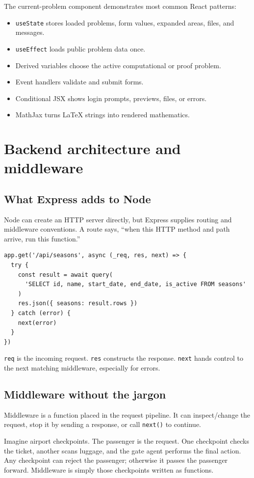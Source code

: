 \documentclass[11pt,oneside]{book}
\newcommand{\code}[1]{\texttt{#1}}
\begin{document}
The current-problem component demonstrates most common React patterns:
\begin{itemize}
  \item \code{useState} stores loaded problems, form values, expanded areas, files, and messages.
  \item \code{useEffect} loads public problem data once.
  \item Derived variables choose the active computational or proof problem.
  \item Event handlers validate and submit forms.
  \item Conditional JSX shows login prompts, previews, files, or errors.
  \item MathJax turns LaTeX strings into rendered mathematics.
\end{itemize}

\chapter{Backend architecture and middleware}

\section{What Express adds to Node}
Node can create an HTTP server directly, but Express supplies routing and middleware conventions. A route says, ``when this HTTP method and path arrive, run this function.''

\begin{lstlisting}
app.get('/api/seasons', async (_req, res, next) => {
  try {
    const result = await query(
      'SELECT id, name, start_date, end_date, is_active FROM seasons'
    )
    res.json({ seasons: result.rows })
  } catch (error) {
    next(error)
  }
})
\end{lstlisting}

\code{req} is the incoming request. \code{res} constructs the response. \code{next} hands control to the next matching middleware, especially for errors.

\section{Middleware without the jargon}
Middleware is a function placed in the request pipeline. It can inspect/change the request, stop it by sending a response, or call \code{next()} to continue.

\begin{mentalbox}
Imagine airport checkpoints. The passenger is the request. One checkpoint checks the ticket, another scans luggage, and the gate agent performs the final action. Any checkpoint can reject the passenger; otherwise it passes the passenger forward. Middleware is simply those checkpoints written as functions.
\end{mentalbox}
\end{document}
